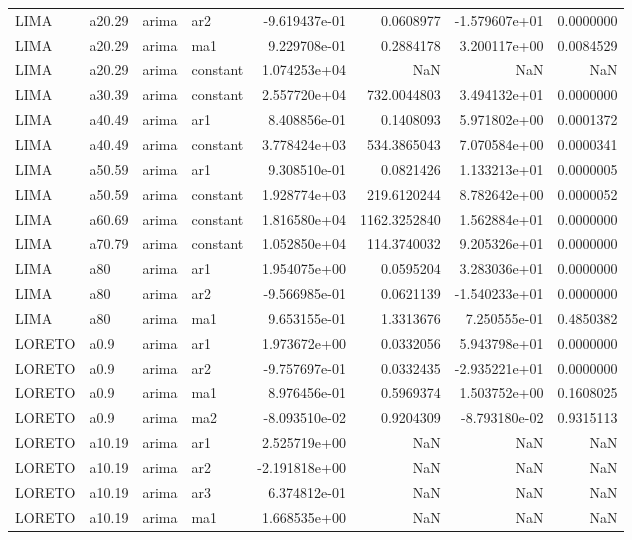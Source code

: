 \documentclass[
]{article}
\begin{document}
\begin{table}[!h]
\begin{tabular}[t]{llllrrrr}
\addlinespace
LIMA & a20.29 & arima & ar2 & -9.619437e-01 & 0.0608977 & -1.579607e+01 & 0.0000000\\
LIMA & a20.29 & arima & ma1 & 9.229708e-01 & 0.2884178 & 3.200117e+00 & 0.0084529\\
LIMA & a20.29 & arima & constant & 1.074253e+04 & NaN & NaN & NaN\\
LIMA & a30.39 & arima & constant & 2.557720e+04 & 732.0044803 & 3.494132e+01 & 0.0000000\\
LIMA & a40.49 & arima & ar1 & 8.408856e-01 & 0.1408093 & 5.971802e+00 & 0.0001372\\
\addlinespace
LIMA & a40.49 & arima & constant & 3.778424e+03 & 534.3865043 & 7.070584e+00 & 0.0000341\\
LIMA & a50.59 & arima & ar1 & 9.308510e-01 & 0.0821426 & 1.133213e+01 & 0.0000005\\
LIMA & a50.59 & arima & constant & 1.928774e+03 & 219.6120244 & 8.782642e+00 & 0.0000052\\
LIMA & a60.69 & arima & constant & 1.816580e+04 & 1162.3252840 & 1.562884e+01 & 0.0000000\\
LIMA & a70.79 & arima & constant & 1.052850e+04 & 114.3740032 & 9.205326e+01 & 0.0000000\\
\addlinespace
LIMA & a80 & arima & ar1 & 1.954075e+00 & 0.0595204 & 3.283036e+01 & 0.0000000\\
LIMA & a80 & arima & ar2 & -9.566985e-01 & 0.0621139 & -1.540233e+01 & 0.0000000\\
LIMA & a80 & arima & ma1 & 9.653155e-01 & 1.3313676 & 7.250555e-01 & 0.4850382\\
LORETO & a0.9 & arima & ar1 & 1.973672e+00 & 0.0332056 & 5.943798e+01 & 0.0000000\\
LORETO & a0.9 & arima & ar2 & -9.757697e-01 & 0.0332435 & -2.935221e+01 & 0.0000000\\
\addlinespace
LORETO & a0.9 & arima & ma1 & 8.976456e-01 & 0.5969374 & 1.503752e+00 & 0.1608025\\
LORETO & a0.9 & arima & ma2 & -8.093510e-02 & 0.9204309 & -8.793180e-02 & 0.9315113\\
LORETO & a10.19 & arima & ar1 & 2.525719e+00 & NaN & NaN & NaN\\
LORETO & a10.19 & arima & ar2 & -2.191818e+00 & NaN & NaN & NaN\\
LORETO & a10.19 & arima & ar3 & 6.374812e-01 & NaN & NaN & NaN\\
\addlinespace
LORETO & a10.19 & arima & ma1 & 1.668535e+00 & NaN & NaN & NaN\\

\end{tabular}
\end{table}
\end{document}
